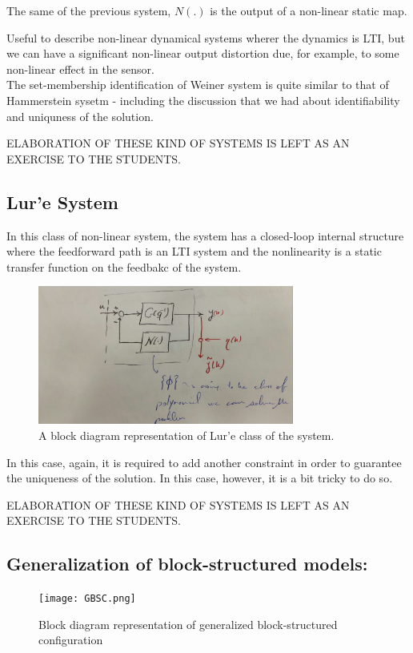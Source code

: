The same of the previous system, $N(.)$ is the output of a non-linear static map.

Useful to describe non-linear dynamical systems wherer the dynamics is LTI, but we can have a significant non-linear output distortion due, for example, to some non-linear effect in the sensor.\\
The set-membership identification of Weiner system is quite similar to that of Hammerstein sysetm - including the discussion that we had about identifiability and uniquness of the solution.

ELABORATION OF THESE KIND OF SYSTEMS IS LEFT AS AN EXERCISE TO THE STUDENTS.
\subsection{Lur'e System}
In this class of non-linear system, the system has a closed-loop internal structure where the feedforward path is an LTI system and the nonlinearity is a static transfer function on the feedbakc of the system.

\begin{figure}[htbp]
    \centering
    \includegraphics[width=0.75\textwidth]{images/Lure.jpg}
    \caption{A block diagram representation of Lur'e class of the system.}
    \label{fig:signal-and-noise}
\end{figure}

In this case, again, it is required to add another constraint in order to guarantee the uniqueness of the solution. In this case, however, it is a bit tricky to do so.

ELABORATION OF THESE KIND OF SYSTEMS IS LEFT AS AN EXERCISE TO THE STUDENTS.

\subsection{Generalization of block-structured models:}

\begin{figure}[H]
    \centering
    \texttt{[image: GBSC.png]}
    \caption{Block diagram representation of generalized block-structured configuration}
\end{figure}

